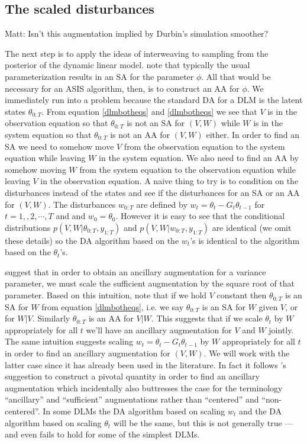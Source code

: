 \documentclass{article}
\newcommand{\matt}[1]{{\color{red} Matt: #1}}
\begin{document}
\subsection{The scaled disturbances} \matt{Isn't this augmentation implied by Durbin's simulation smoother?}

The next step is to apply the ideas of interweaving to sampling from the posterior of the dynamic linear model.  note that typically the usual parameterization results in an SA for the parameter $\phi$. All that would be necessary for an ASIS algorithm, then, is to construct an AA for $\phi$. We immediately run into a problem because the standard DA for a DLM is the latent states $\theta_{0:T}$. From equation \eqref{dlmbotheqs} and \eqref{dlmbotheqs} we see that $V$ is in the observation equation so that $\theta_{0:T}$ is not an SA for $(V,W)$ while $W$ is in the system equation so that $\theta_{0:T}$ is not an AA for $(V,W)$ either. In order to find an SA we need to somehow move $V$ from the observation equation to the system equation while leaving $W$ in the system equation. We also need to find an AA by somehow moving $W$ from the system equation to the observation equation while leaving $V$ in the observation equation. A naive thing to try is to condition on the disturbances instead of the states and see if the disturbances for an SA or an AA for $(V,W)$. The disturbances $w_{0:T}$ are defined by $w_t = \theta_t - G_t\theta_{t-1}$ for $t=1,,2,\cdots,T$ and and $w_0=\theta_0$. However it is easy to see that the conditional distributions $p(V,W|\theta_{0:T},y_{1:T})$ and $p(V,W|w_{0:T},y_{1:T})$ are identical (we omit these details) so the DA algorithm based on the $w_t$'s is identical to the algorithm based on the $\theta_t$'s.

 suggest that in order to obtain an ancillary augmentation for a variance parameter, we must scale the sufficient augmentation by the square root of that parameter. Based on this intuition, note that if we hold $V$ constant then $\theta_{0:T}$ is an SA for $W$ from equation \eqref{dlmbotheqs}, i.e. we say $\theta_{0:T}$ is an SA for $W$ given $V$, or for $W|V$. Similarly $\theta_{0:T}$ is an AA for $V|W$. This suggests that if we scale $\theta_{t}$ by $W$ appropriately for all $t$ we'll have an ancillary augmentation for $V$ and $W$ jointly. The same intuition suggests scaling $w_{t}=\theta_{t}-G_t\theta_{t-1}$ by $W$ appropriately for all $t$ in order to find an ancillary augmentation for $(V,W)$. We will work with the latter case since it has already been used in the literature. In fact it follows 's suggestion to construct a pivotal quantity in order to find an ancillary augmentation which incidentally also buttresses the case for the terminology ``ancillary'' and ``sufficient'' augmentations rather than ``centered'' and ``non-centered''. In some DLMs the DA algorithm based on scaling $w_t$ and the DA algorithm based on scaling $\theta_t$ will be the same, but this is not generally true --- and even fails to hold for some of the simplest DLMs.
\end{document}
